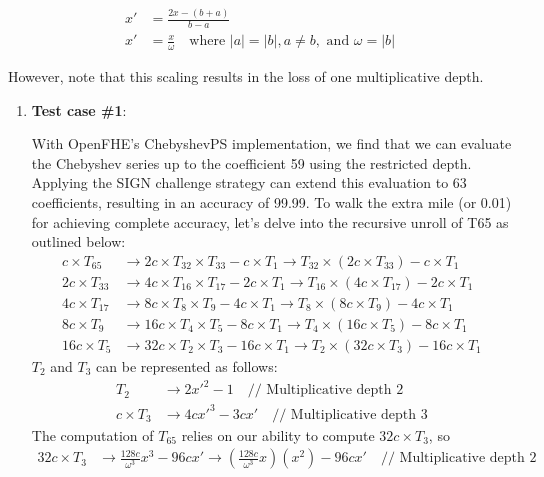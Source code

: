 \documentclass[article]{iacrtrans}
\begin{document}
\begin{align*}
x' &= \frac{2x - (b + a)}{b - a} \\
x' &= \frac{x}{\omega} \quad \text{where } |a| = |b|, a \neq b, \text{ and } \omega = |b|
\end{align*}

However, note that this scaling results in the loss of one multiplicative depth. 

\begin{enumerate}
    \item \textbf {Test case \#1}:

    With OpenFHE's ChebyshevPS implementation, we find that we can evaluate the Chebyshev series up to the coefficient 59 using the restricted depth. Applying the SIGN challenge strategy can extend this evaluation to 63 coefficients, resulting in an accuracy of 99.99. To walk the extra mile (or 0.01) for achieving complete accuracy, let's delve into the recursive unroll of T65  as outlined below:
    \begin{align}
        c \times T_{65} &\rightarrow 2c \times T_{32} \times T_{33} - c \times T_{1} \rightarrow T_{32} \times (2c \times T_{33}) - c \times T_{1} \\
        2c \times T_{33} &\rightarrow 4c \times T_{16} \times T_{17} - 2c \times T_{1} \rightarrow T_{16} \times (4c \times T_{17}) - 2c \times T_{1} \\
        4c \times T_{17} &\rightarrow 8c \times T_{8} \times T_{9} - 4c \times T_{1} \rightarrow T_{8} \times (8c \times T_{9}) - 4c \times T_{1} \\
        8c \times T_{9} &\rightarrow 16c \times T_{4} \times T_{5} - 8c \times T_{1} \rightarrow T_{4} \times (16c \times T_{5}) - 8c \times T_{1} \\
        16c \times T_{5} &\rightarrow 32c \times T_{2} \times T_{3} - 16c \times T_{1} \rightarrow T_{2} \times (32c \times T_{3}) - 16c \times T_{1}
    \end{align}
$T_2$  and $T_3$ can be represented as follows:
\begin{align*}
    T_2 &\rightarrow 2x'^2 - 1 \quad \text{// Multiplicative depth 2} \\
    c \times T_3 &\rightarrow 4cx'^3 - 3cx' \quad \text{// Multiplicative depth 3}
\end{align*}
The computation of $T_{65}$  relies on our ability to compute $32c \times T_{3}$, so
\begin{align*}
    32c \times T_3 &\rightarrow \frac{128c}{\omega^3}x^3 - 96cx' \rightarrow \left(\frac{128c}{\omega^3}x\right)(x^2) - 96cx' \quad \text{// Multiplicative depth 2}
\end{align*}


\end{enumerate}
\end{document}
